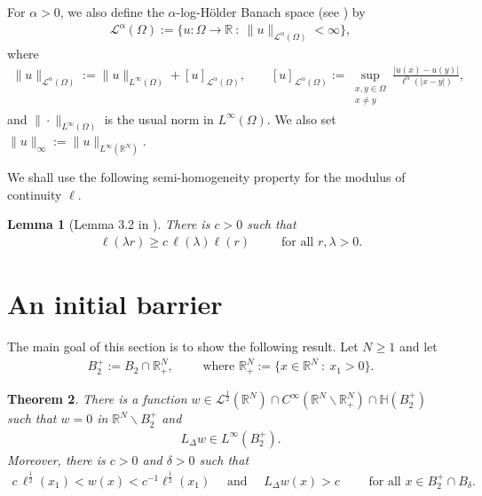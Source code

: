 \documentclass[11pt]{article}
\newcommand{\R}{\mathbb{R}}
\numberwithin{equation}{section}
\newtheorem{theorem}{Theorem}[section]
\newtheorem{lemma}[theorem]{Lemma}
\newcommand{\cL}{{\mathcal L}}
\begin{document}
For $\alpha>0$, we also define the $\alpha$-log-Hölder Banach space (see \cite[Lemma 7.1]{CS22}) by 
\begin{align}\label{log:H:def}
\mathcal L^\alpha(\Omega):=\{u:\Omega\to\R\::\: \|u\|_{\mathcal L^\alpha(\Omega)}<\infty\},
\end{align}
where 
\begin{align*}
\|u\|_{\mathcal L^\alpha(\Omega)} := \|u\|_{L^\infty(\Omega)} + [u]_{\mathcal L^{\alpha}(\Omega)},\qquad 
[u]_{\mathcal L^\alpha(\Omega)} := \sup_{\substack{x,y\in \Omega\\x\neq y}}\frac{|u(x)-u(y)|}{\ell^\alpha(|x-y|)},
\end{align*}
and $\|\cdot\|_{L^\infty(\Omega)}$ is the usual norm in $L^\infty(\Omega)$. We also set $\|u\|_\infty:=\|u\|_{L^\infty(\R^N)}$.

 We shall use the following semi-homogeneity property for the modulus of continuity $\ell$.  
\begin{lemma}[Lemma 3.2 in \cite{CS22}]\label{prop1}
There is $c>0$ such that 
\begin{align*}
\ell(\lambda r)\geq c\, \ell(\lambda)\ell(r)\,\qquad \text{ for all }r,\lambda >0.    
\end{align*}
\end{lemma}

\section{An initial barrier}\label{ini:sec}

The main goal of this section is to show the following result. Let $N \geq 1$ and let 
\begin{align}\label{Omega:def}
    B_2^+:=B_2\cap \R^N_+, \qquad  \text{ where }\R^N_+:=\{x\in\R^N\::\: x_1>0\}.
\end{align}

\begin{theorem}\label{barrier:thm}
There is a function $w\in \cL^{\frac{1}{2}}(\R^N)\cap C^\infty(\R^N\backslash \R^N_+)\cap {\mathbb H}(B_2^+)$ such that $w=0$ in $\R^N\backslash B_2^+$ and
\begin{align*}
L_\Delta w\in L^\infty(B_2^+).
\end{align*}
Moreover, there is $c>0$ and $\delta>0$ such that
\begin{align*}
c\,\ell^{\frac{1}{2}}(x_1) <w(x)<c^{-1}\ell^{\frac{1}{2}}(x_1)
\quad \text{ and }\quad 
L_\Delta w(x)>c\qquad \text{ for all }x\in B_2^+\cap B_\delta.
\end{align*}
\end{theorem}
\end{document}
